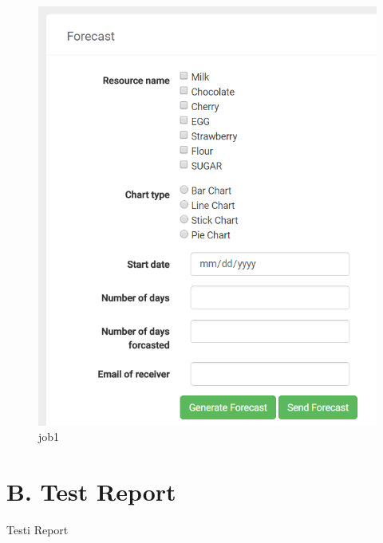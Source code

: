 \documentclass[a4paper,11pt,twoside]{report}
\theoremstyle{definition}
\begin{document}
\begin{figure}[h!]
\begin{center}
\includegraphics[width=\textwidth]{AS/report/4}
\end{center}
\caption{job1}
\end{figure}
\thispagestyle{empty}





\chapter*{B. Test Report}

Testi Report
\thispagestyle{empty}
\end{document}
